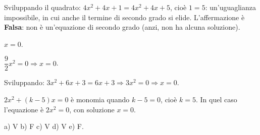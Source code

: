 \documentclass[11pt]{report}
\begin{document}
\begin{expsolution}[8]
Sviluppando il quadrato: $4x^2+4x+1=4x^2+4x+5$, cioè $1=5$: un'uguaglianza impossibile, in cui anche il termine di secondo grado si elide. L'affermazione è \textbf{Falsa}: non è un'equazione di secondo grado (anzi, non ha alcuna soluzione).
\end{expsolution}

\begin{expsolution}[9]
$x=0$.
\end{expsolution}

\begin{expsolution}[10]
$\dfrac92 x^2=0 \Rightarrow x=0$.
\end{expsolution}

\begin{expsolution}[11]
Sviluppando: $3x^2+6x+3=6x+3 \Rightarrow 3x^2=0 \Rightarrow x=0$.
\end{expsolution}

\begin{expsolution}[12]
$2x^2+(k-5)x=0$ è monomia quando $k-5=0$, cioè $k=5$. In quel caso l'equazione è $2x^2=0$, con soluzione $x=0$.
\end{expsolution}

\begin{expsolution}[13]
a) V \quad b) F \quad c) V \quad d) V \quad e) F.
\end{expsolution}
\end{document}
